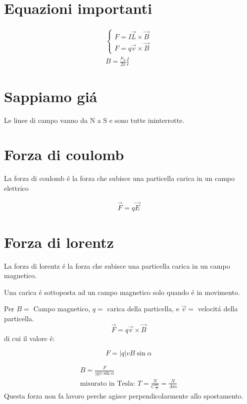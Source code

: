 \documentclass{article}
\title{\jobname}
\author{Eugenio Animali}
\begin{document}
\maketitle
\section*{Equazioni importanti}
\begin{gather}
    \begin{cases}
        F=I\vec{L}\times\vec{B}\\
        F=q\vec{v}\times\vec{B}
    \end{cases}\\
    B=\frac{\mu_0}{2\pi}\frac{I}{r}
\end{gather}
\section*{Sappiamo giá}

Le linee di campo vanno da N a S e sono tutte ininterrotte.

\section*{Forza di coulomb}

La forza di coulomb é la forza che subisce una particella carica in un campo elettrico

\begin{gather*}
    \vec{F} = q\vec{E}
\end{gather*}
\section*{Forza di lorentz}
La forza di lorentz é la forza che subisce una particella carica in un campo magnetico.

Una carica é sottoposta ad un campo magnetico solo quando é in movimento.

Per $B = $ Campo magnetico, $q=$ carica della particella, e $\vec{v}=$ velocitá della particella.
\[
    \vec{F}=q\vec{v}\times\vec{B}
    \]
di cui il valore é:

    \[
    F=|q|vB\sin\alpha
\]

\begin{gather*}
    B=\frac{F}{|q|v\sin\alpha}\\
    \text{misurato in Tesla: } T=\frac{N}{C\frac{m}{s}} = \frac{N}{Am}
\end{gather*}
Questa forza non fa lavoro perche agisce perpendicolarmente allo spostamento.
\end{document}

